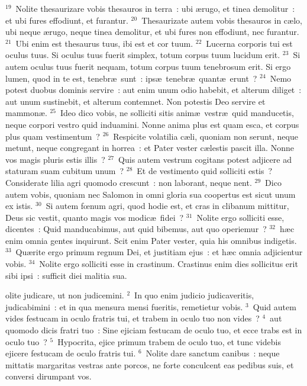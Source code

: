 ${}^{19}$~Nolite thesaurizare vobis thesauros in terra~: ubi \ae rugo, et tinea demolitur~: et ubi fures effodiunt, et furantur.
${}^{20}$~Thesaurizate autem vobis thesauros in c\ae lo, ubi neque \ae rugo, neque tinea demolitur, et ubi fures non effodiunt, nec furantur.
${}^{21}$~Ubi enim est thesaurus tuus, ibi est et cor tuum.
${}^{22}$~Lucerna corporis tui est oculus tuus. Si oculus tuus fuerit simplex, totum corpus tuum lucidum erit.
${}^{23}$~Si autem oculus tuus fuerit nequam, totum corpus tuum tenebrosum erit. Si ergo lumen, quod in te est, tenebr\ae\ sunt~: ips\ae\ tenebr\ae\ quant\ae\ erunt~?
${}^{24}$~Nemo potest duobus dominis servire~: aut enim unum odio habebit, et alterum diliget~: aut unum sustinebit, et alterum contemnet. Non potestis Deo servire et mammon\ae .
${}^{25}$~Ideo dico vobis, ne solliciti sitis anim\ae\ vestr\ae\ quid manducetis, neque corpori vestro quid induamini. Nonne anima plus est quam esca, et corpus plus quam vestimentum~?
${}^{26}$~Respicite volatilia c\ae li, quoniam non serunt, neque metunt, neque congregant in horrea~: et Pater vester c\ae lestis pascit illa. Nonne vos magis pluris estis illis~?
${}^{27}$~Quis autem vestrum cogitans potest adjicere ad staturam suam cubitum unum~?
${}^{28}$~Et de vestimento quid solliciti estis~? Considerate lilia agri quomodo crescunt~: non laborant, neque nent.
${}^{29}$~Dico autem vobis, quoniam nec Salomon in omni gloria sua coopertus est sicut unum ex istis.
${}^{30}$~Si autem fœnum agri, quod hodie est, et cras in clibanum mittitur, Deus sic vestit, quanto magis vos modic\ae\ fidei~?
${}^{31}$~Nolite ergo solliciti esse, dicentes~: Quid manducabimus, aut quid bibemus, aut quo operiemur~?
${}^{32}$~h\ae c enim omnia gentes inquirunt. Scit enim Pater vester, quia his omnibus indigetis.
${}^{33}$~Qu\ae rite ergo primum regnum Dei, et justitiam ejus~: et h\ae c omnia adjicientur vobis.
${}^{34}$~Nolite ergo solliciti esse in crastinum. Crastinus enim dies sollicitus erit sibi ipsi~: sufficit diei malitia sua.

\bchapter
{}olite judicare, ut non judicemini.
${}^{2}$~In quo enim judicio judicaveritis, judicabimini~: et in qua mensura mensi fueritis, remetietur vobis.
${}^{3}$~Quid autem vides festucam in oculo fratris tui, et trabem in oculo tuo non vides~?
${}^{4}$~aut quomodo dicis fratri tuo~: Sine ejiciam festucam de oculo tuo, et ecce trabs est in oculo tuo~?
${}^{5}$~Hypocrita, ejice primum trabem de oculo tuo, et tunc videbis ejicere festucam de oculo fratris tui.
${}^{6}$~Nolite dare sanctum canibus~: neque mittatis margaritas vestras ante porcos, ne forte conculcent eas pedibus suis, et conversi dirumpant vos.


